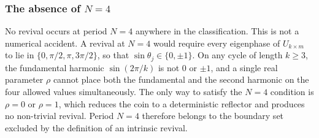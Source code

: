 \subsubsection{The absence of $N = 4$}

No revival occurs at period $N = 4$ anywhere in the classification.
This is not a numerical accident. A revival at $N = 4$ would require
every eigenphase of $U_{k \times m}$ to lie in
$\{0, \pi/2, \pi, 3\pi/2\}$, so that $\sin\theta_j \in \{0, \pm 1\}$.
On any cycle of length $k \ge 3$, the fundamental harmonic
$\sin(2\pi/k)$ is not $0$ or $\pm 1$, and a single real parameter
$\rho$ cannot place both the fundamental and the second harmonic on
the four allowed values simultaneously. The only way to satisfy the
$N = 4$ condition is $\rho = 0$ or $\rho = 1$, which reduces the coin
to a deterministic reflector and produces no non-trivial revival. Period
$N = 4$ therefore belongs to the boundary set excluded by the
definition of an intrinsic revival.
